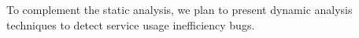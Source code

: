 \documentclass[sigconf,review, anonymous]{acmart}
\begin{document}
To complement the static analysis, we plan to present dynamic analysis techniques to detect service usage inefficiency bugs.




\end{document}
